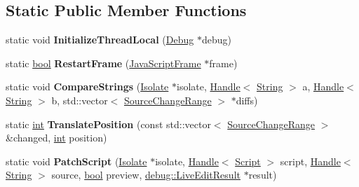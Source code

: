 \subsection*{Static Public Member Functions}
\begin{DoxyCompactItemize}
\item 
\mbox{\label{classv8_1_1internal_1_1LiveEdit_a9b5ea06802163d74690511e89f07cffd}} 
static void {\bfseries Initialize\+Thread\+Local} (\mbox{\hyperlink{classv8_1_1internal_1_1Debug}{Debug}} $\ast$debug)
\item 
\mbox{\label{classv8_1_1internal_1_1LiveEdit_a5087a6755bfe52168a7aae5abdf8a2a1}} 
static \mbox{\hyperlink{classbool}{bool}} {\bfseries Restart\+Frame} (\mbox{\hyperlink{classv8_1_1internal_1_1JavaScriptFrame}{Java\+Script\+Frame}} $\ast$frame)
\item 
\mbox{\label{classv8_1_1internal_1_1LiveEdit_ae137d77566f827ef36c1a756565c26c5}} 
static void {\bfseries Compare\+Strings} (\mbox{\hyperlink{classv8_1_1internal_1_1Isolate}{Isolate}} $\ast$isolate, \mbox{\hyperlink{classv8_1_1internal_1_1Handle}{Handle}}$<$ \mbox{\hyperlink{classv8_1_1internal_1_1String}{String}} $>$ a, \mbox{\hyperlink{classv8_1_1internal_1_1Handle}{Handle}}$<$ \mbox{\hyperlink{classv8_1_1internal_1_1String}{String}} $>$ b, std\+::vector$<$ \mbox{\hyperlink{structv8_1_1internal_1_1SourceChangeRange}{Source\+Change\+Range}} $>$ $\ast$diffs)
\item 
\mbox{\label{classv8_1_1internal_1_1LiveEdit_ac8240273701e02c17dac0152d6f327d9}} 
static \mbox{\hyperlink{classint}{int}} {\bfseries Translate\+Position} (const std\+::vector$<$ \mbox{\hyperlink{structv8_1_1internal_1_1SourceChangeRange}{Source\+Change\+Range}} $>$ \&changed, \mbox{\hyperlink{classint}{int}} position)
\item 
\mbox{\label{classv8_1_1internal_1_1LiveEdit_afebb3ab02d37f2c0cbd132bed0b4a089}} 
static void {\bfseries Patch\+Script} (\mbox{\hyperlink{classv8_1_1internal_1_1Isolate}{Isolate}} $\ast$isolate, \mbox{\hyperlink{classv8_1_1internal_1_1Handle}{Handle}}$<$ \mbox{\hyperlink{classv8_1_1internal_1_1Script}{Script}} $>$ script, \mbox{\hyperlink{classv8_1_1internal_1_1Handle}{Handle}}$<$ \mbox{\hyperlink{classv8_1_1internal_1_1String}{String}} $>$ source, \mbox{\hyperlink{classbool}{bool}} preview, \mbox{\hyperlink{structv8_1_1debug_1_1LiveEditResult}{debug\+::\+Live\+Edit\+Result}} $\ast$result)
\end{DoxyCompactItemize}
